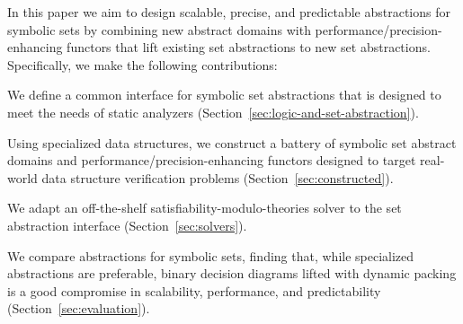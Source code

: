 In this paper we aim to design scalable, precise, and predictable abstractions for symbolic sets by combining new abstract domains with performance/precision-enhancing functors that lift existing set abstractions to new set abstractions.  Specifically, we make the following contributions:
%
\begin{compactitem}
\item We define a common interface for symbolic set abstractions that is designed to meet the needs of static analyzers (Section~\ref{sec:logic-and-set-abstraction}).
%
\item Using specialized data structures, we construct a battery of symbolic set abstract domains and performance/precision-enhancing functors designed to target real-world data structure verification problems (Section~\ref{sec:constructed}).
%
\item We adapt an off-the-shelf satisfiability-modulo-theories solver to the set abstraction interface (Section~\ref{sec:solvers}).
%
\item We compare abstractions for symbolic sets, finding that, while specialized abstractions are preferable, binary decision diagrams lifted with dynamic packing is a good compromise in scalability, performance, and predictability (Section~\ref{sec:evaluation}).
%
\end{compactitem}
